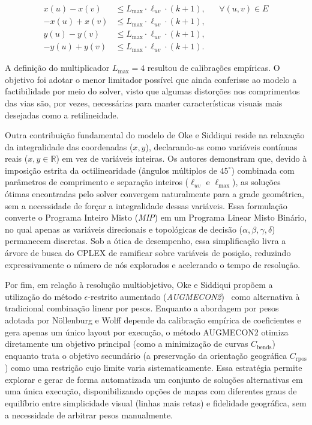 \documentclass[cic,tc]{infufrgs}
\begin{document}
\begin{align}
x(u) - x(v) &\le L_{\max} \cdot \ell_{uv} \cdot (k + 1), && \forall (u, v) \in E \label{eq:oke_limite_maximo} \\
-x(u) + x(v) &\le L_{\max} \cdot \ell_{uv} \cdot (k + 1), \nonumber \\
y(u) - y(v) &\le L_{\max} \cdot \ell_{uv} \cdot (k + 1), \nonumber \\
-y(u) + y(v) &\le L_{\max} \cdot \ell_{uv} \cdot (k + 1). \nonumber
\end{align}

A definição do multiplicador $L_{\max} = 4$ resultou de calibrações empíricas. O objetivo foi adotar o menor limitador possível que ainda conferisse ao modelo a factibilidade por meio do solver, visto que algumas distorções nos comprimentos das vias são, por vezes, necessárias para manter características visuais mais desejadas como a retilineidade.

Outra contribuição fundamental do modelo de Oke e Siddiqui reside na relaxação da integralidade das coordenadas ($x, y$), declarando-as como variáveis contínuas reais ($x, y \in \mathbb{R}$) em vez de variáveis inteiras. Os autores demonstram que, devido à imposição estrita da octilinearidade (ângulos múltiplos de $45^\circ$) combinada com parâmetros de comprimento e separação inteiros ($\ell_{uv}$ e $\ell_{\max}$), as soluções ótimas encontradas pelo solver convergem naturalmente para a grade geométrica, sem a necessidade de forçar a integralidade dessas variáveis. Essa formulação converte o Programa Inteiro Misto (\textit{MIP}) em um Programa Linear Misto Binário, no qual apenas as variáveis direcionais e topológicas de decisão ($\alpha, \beta, \gamma, \delta$) permanecem discretas. Sob a ótica de desempenho, essa simplificação livra a árvore de busca do CPLEX de ramificar sobre variáveis de posição, reduzindo expressivamente o número de nós explorados e acelerando o tempo de resolução.

Por fim, em relação à resolução multiobjetivo, Oke e Siddiqui propõem a utilização do método $\epsilon$-restrito aumentado (\textit{AUGMECON2})~\cite{MAVROTAS20139652} como alternativa à tradicional combinação linear por pesos. Enquanto a abordagem por pesos adotada por Nöllenburg e Wolff depende da calibração empírica de coeficientes e gera apenas um único layout por execução, o método AUGMECON2 otimiza diretamente um objetivo principal (como a minimização de curvas $C_{\text{bends}}$) enquanto trata o objetivo secundário (a preservação da orientação geográfica $C_{\text{rpos}}$) como uma restrição cujo limite varia sistematicamente. Essa estratégia permite explorar e gerar de forma automatizada um conjunto de soluções alternativas em uma única execução, disponibilizando opções de mapas com diferentes graus de equilíbrio entre simplicidade visual (linhas mais retas) e fidelidade geográfica, sem a necessidade de arbitrar pesos manualmente.
\end{document}
